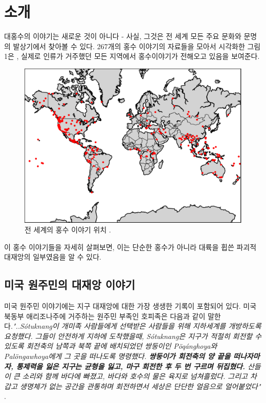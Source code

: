 \documentclass[10pt,twocolumn,letterpaper]{article}
\begin{document}
\section{소개}

대홍수의 이야기는 새로운 것이 아니다 - 사실, 그것은 전 세계 모든 주요 문화와 문명의 발상기에서 찾아볼 수 있다. 267개의 홍수 이야기의 자료들을 모아서 시각화한 그림 1은 \cite{3}, 실제로  인류가 거주했던 모든 지역에서 홍수이야기가 전해오고 있음을 보여준다.

\begin{figure}[h]
\begin{center}
   \includegraphics[width=1\linewidth]{b.png}
\end{center}
   \caption{전 세계의 홍수 이야기 위치 \cite{3}.}
\label{fig:1}
\label{fig:onecol}
\end{figure}

이 홍수 이야기들을 자세히 살펴보면, 이는 단순한 홍수가 아니라 대륙을 휩쓴 파괴적 대재앙의 일부였음을 알 수 있다.

\subsection{미국 원주민의 대재앙 이야기}

미국 원주민 이야기에는 지구 대재앙에 대한 가장 생생한 기록이 포함되어 있다. 미국 북동부 애리조나주에 거주하는 원주민 부족인 호피족은 다음과 같이 말한다.\textit{"..Sótuknang이 개미족 사람들에게 선택받은 사람들을 위해 지하세계를 개방하도록 요청했다. 그들이 안전하게 지하에 도착했을때, Sótuknang은 지구가 적절히 회전할 수 있도록 회전축의 남쪽과 북쪽 끝에 배치되었던 쌍둥이인 Pöqánghoya와 Palöngawhoya에게 그 곳을 떠나도록 명령했다. \textbf{쌍둥이가 회전축의 양 끝을 떠나자마자, 통제력을 잃은 지구는 균형을 잃고,  마구 회전한 후 두 번 구르며 뒤집혔다.} 산들이 큰 소리와 함께 바다에 빠졌고, 바다와 호수의 물은 육지로 넘쳐흘렀다. 그리고 차갑고 생명체가 없는 공간을 관통하며 회전하면서 세상은 단단한 얼음으로 얼어붙었다"} \cite{4}.
\end{document}
